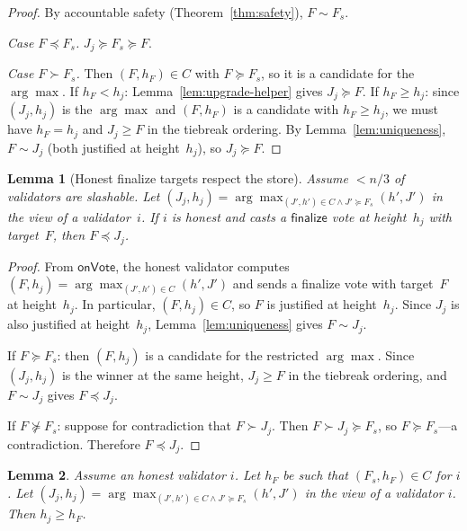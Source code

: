 \ifx\litemode\undefined\documentclass{article}\fi
\newcommand{\finalize}{\mathsf{finalize}}
\theoremstyle{plain}
\newtheorem{lemma}{Lemma}
\theoremstyle{definition}
\theoremstyle{remark}
\begin{document}
\begin{proof}
By accountable safety (Theorem~\ref{thm:safety}), $F \sim F_s$.

\emph{Case $F \preceq F_s$.}
$J_j \succeq F_s \succeq F$.

\emph{Case $F \succ F_s$.}
Then $(F, h_F) \in C$ with $F \succeq F_s$, so it is a candidate for the $\arg\max$.
If $h_F < h_j$: Lemma~\ref{lem:upgrade-helper} gives $J_j \succeq F$.
If $h_F \geq h_j$: since $(J_j, h_j)$ is the $\arg\max$ and $(F, h_F)$ is a candidate with $h_F \geq h_j$, we must have $h_F = h_j$ and $J_j \geq F$ in the tiebreak ordering.
By Lemma~\ref{lem:uniqueness}, $F \sim J_j$ (both justified at height~$h_j$), so $J_j \succeq F$.
\end{proof}

\begin{lemma}[Honest finalize targets respect the store]\label{lem:honest-fin}
  Assume $< n/3$ of validators are slashable.
  Let $(J_j, h_j) = \arg\max_{(J',h')\in C \land J' \succeq F_s}(h', J')$ in the view of a validator~$i$.
  If $i$ is honest and casts a $\finalize$ vote at height~$h_j$ with target~$F$, then $F \preceq J_j$.
\end{lemma}

\begin{proof}
From $\textsf{onVote}$, the honest validator computes $(F, h_j) = \arg\max_{(J',h')\in C}(h', J')$ and sends a finalize vote with target~$F$ at height~$h_j$.
In particular, $(F, h_j) \in C$, so $F$ is justified at height~$h_j$.
Since $J_j$ is also justified at height~$h_j$, Lemma~\ref{lem:uniqueness} gives $F \sim J_j$.

If $F \succeq F_s$: then $(F, h_j)$ is a candidate for the restricted $\arg\max$.
Since $(J_j, h_j)$ is the winner at the same height, $J_j \geq F$ in the tiebreak ordering, and $F \sim J_j$ gives $F \preceq J_j$.

If $F \not\succeq F_s$: suppose for contradiction that $F \succ J_j$.
Then $F \succ J_j \succeq F_s$, so $F \succeq F_s$---a contradiction.
Therefore $F \preceq J_j$.
\end{proof}


\begin{lemma}
  Assume an honest validator $i$.
  Let $h_F$ be such that $(F_s, h_F) \in C$ for $i$.
  Let $(J_j, h_j) = \arg\max_{(J',h')\in C \land J' \succeq F_s}(h', J')$ in the view of a validator $i$.
  Then $h_j \geq h_F$.
\end{lemma}
\end{document}
